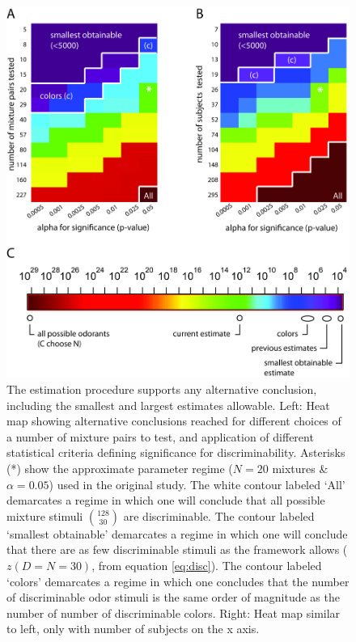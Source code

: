\documentclass[letterpaper,twocolumn,10pt]{article}
\begin{document}
\begin{figure}
    \centering
    \includegraphics[width=1.0\textwidth]{figures/Fig3_Colormaps}
    \caption{
The estimation procedure supports any alternative conclusion, including the smallest and largest estimates allowable. 
Left: Heat map showing alternative conclusions reached for different choices of a number of mixture pairs to test, 
and application of different statistical criteria defining significance for discriminability. 
Asterisks (*) show the approximate parameter regime ($N=20$ mixtures \& $\alpha=0.05$) used in the original study. 
The white contour labeled `All' demarcates a regime in which one will conclude that all possible mixture stimuli ${128 \choose 30}$ are discriminable. 
The contour labeled `smallest obtainable' demarcates a regime in which one will conclude that 
there are as few discriminable stimuli as the framework allows ($z(D=N=30)$, from equation \ref{eq:disc}). 
The contour labeled `colors' demarcates a regime in which 
one concludes that the number of discriminable odor stimuli is the same order of magnitude as the number of number of discriminable colors. 
Right: Heat map similar to left, only with number of subjects on the x axis.}
    \label{fig:colormaps}
\end{figure}
\end{document}
